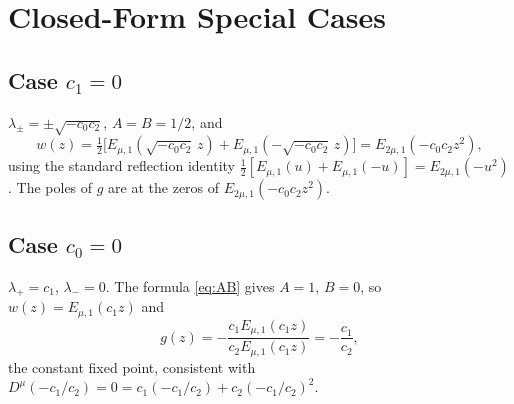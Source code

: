 \documentclass[12pt,a4paper]{amsart}
\newcommand{\ML}[2]{E_{#1,#2}}
\theoremstyle{plain}
\theoremstyle{definition}
\theoremstyle{remark}
\begin{document}
\section{Closed-Form Special Cases}\label{app:special}

\subsection*{Case $c_1=0$}

$\lambda_\pm=\pm\sqrt{-c_0 c_2}$, $A=B=1/2$, and
\[
  w(z)=\tfrac{1}{2}\bigl[\ML{\mu}{1}(\sqrt{-c_0 c_2}\,z)
                         +\ML{\mu}{1}(-\sqrt{-c_0 c_2}\,z)\bigr]
      =\ML{2\mu}{1}(-c_0 c_2 z^2),
\]
using the standard reflection identity
$\tfrac{1}{2}[E_{\mu,1}(u)+E_{\mu,1}(-u)]=E_{2\mu,1}(-u^2)$.
The poles of $g$ are at the zeros of $\ML{2\mu}{1}(-c_0 c_2 z^2)$.

\subsection*{Case $c_0=0$}

$\lambda_+=c_1$, $\lambda_-=0$. The formula \eqref{eq:AB} gives
$A=1$, $B=0$, so $w(z)=\ML{\mu}{1}(c_1 z)$ and
\[
  g(z)=-\frac{c_1\ML{\mu}{1}(c_1 z)}{c_2\ML{\mu}{1}(c_1 z)}=-\frac{c_1}{c_2},
\]
the constant fixed point, consistent with $D^\mu(-c_1/c_2)=0=c_1(-c_1/c_2)+c_2(-c_1/c_2)^2$.
\end{document}
